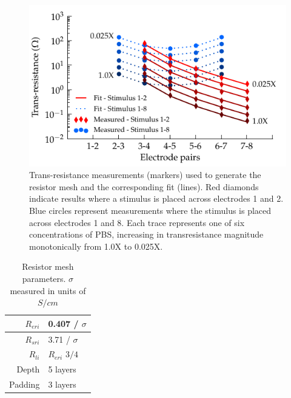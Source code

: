 \documentclass[10pt,final,journal]{IEEEtran}
\begin{document}
\begin{figure}
    \begin{center}
        \includegraphics{graphics/pbs_transimpedance_IEEE}
    \end{center}
    \caption{Trans-resistance measurements (markers) used to generate the resistor mesh and the corresponding fit (lines). Red diamonds indicate results where a stimulus is placed across electrodes 1 and 2. Blue circles represent measurements where the stimulus is placed across electrodes 1 and 8. Each trace represents one of six concentrations of PBS, increasing in transresistance magnitude monotonically from 1.0X to 0.025X.}
    \label{fig:transresistance}
\end{figure} 

\begin{table}
    \begin{center}
        \begin{tabular}{|r|l|}
            \hline
            $R_{eri}$ & 0.407 / $\sigma$ \\ \hline
            $R_{sri}$ & 3.71 / $\sigma$ \\ \hline
            $R_{li}$ & $R_{eri}$ $3/4$ \\ \hline
            Depth & 5 layers \\ \hline
            Padding & 3 layers \\ \hline
        \end{tabular}
    \end{center}
    \caption{Resistor mesh parameters. $\sigma$ measured in units of $S/cm$}
    \label{tab:RESparams}
\end{table}
\end{document}
